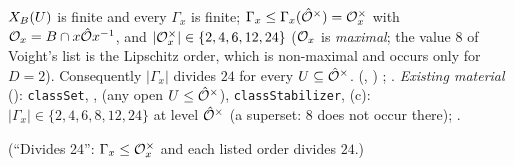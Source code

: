 \begin{proposition}[finiteness]\label{prop:s01-finite}
$X_B(U)$ is finite and every $\Gamma_x$ is finite; $\Gamma_x\le\Gamma_x(\hat{\mathcal{O}}^\times)=\mathcal{O}_x^\times$ with $\mathcal{O}_x=B\cap x\hat{\mathcal{O}} x^{-1}$,
and $|\mathcal{O}_x^\times|\in\{2,4,6,12,24\}$ ($\mathcal{O}_x$ is \emph{maximal}; the value $8$ of Voight's list is the Lipschitz order,
which is non-maximal and occurs only for $D=2$). Consequently $|\Gamma_x|$ divides $24$ for every $U\subseteq\hat{\mathcal{O}}^\times$.
\stknown{} \stformal{} (, ) ; .
\emph{Existing material} (\stformal):  \texttt{classSet}, ,
 (any open $U\le\hat{\mathcal{O}}^\times$), \texttt{classStabilizer}, 
(c): $|\Gamma_x|\in\{2,4,6,8,12,24\}$ at level $\hat{\mathcal{O}}^\times$ (a superset: $8$ does not occur there);  .
\end{proposition}
\noindent(``Divides 24'': $\Gamma_x\le\mathcal{O}_x^\times$ and each listed order divides $24$.)
